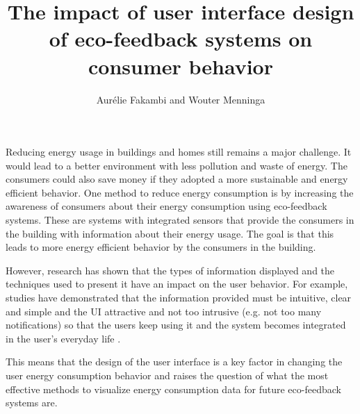 \documentclass[journal]{vgtc}                %
\title{The impact of user interface design of eco-feedback systems on consumer behavior}
\author{Aur\'{e}lie Fakambi and Wouter Menninga}
\begin{document}


\maketitle


Reducing energy usage in buildings and homes still remains a major challenge. It would lead to a better environment with less pollution and waste of energy. The consumers could also save money if they adopted a more sustainable and energy efficient behavior. %
One method to reduce energy consumption is by increasing the awareness of consumers about their energy consumption using eco-feedback systems. These are systems with integrated sensors that provide the consumers in the building with information about their energy usage. The goal is that this leads to more energy efficient behavior by the consumers in the building. 

However, research has shown that the types of information displayed and the techniques used to present it have an impact on the user behavior.
For example, studies have demonstrated that the information provided must be intuitive, clear and simple and the UI attractive and not too intrusive (e.g. not too many notifications) so that the users keep using it and the system becomes integrated in the user's everyday life \cite{spagnolli2011eco}.

This means that the design of the user interface is a key factor in changing the user energy consumption behavior and raises the question of what the most effective methods to visualize energy consumption data for future eco-feedback systems are. 
\end{document}
